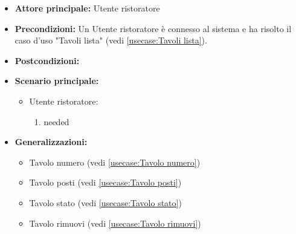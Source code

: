 \label{usecase:Tavoli dettaglio}
\begin{itemize}
\item \textbf{Attore principale:} Utente ristoratore
\item \textbf{Precondizioni:}
Un Utente ristoratore è connesso al sistema e ha risolto il caso d'uso "Tavoli lista" (vedi \autoref{usecase:Tavoli lista}).
\item \textbf{Postcondizioni:}
\item \textbf{Scenario principale:}
\begin{itemize}
\item Utente ristoratore:
\begin{enumerate}
\item needed
\end{enumerate}
\end{itemize}
\item \textbf{Generalizzazioni:}
\begin{itemize}
\item Tavolo numero (vedi \autoref{usecase:Tavolo numero})\item Tavolo posti (vedi \autoref{usecase:Tavolo posti})\item Tavolo stato (vedi \autoref{usecase:Tavolo stato})\item Tavolo rimuovi (vedi \autoref{usecase:Tavolo rimuovi})
\end{itemize}
\end{itemize}